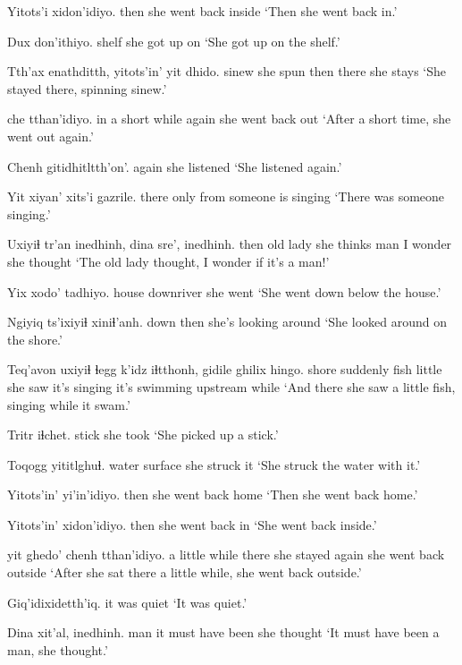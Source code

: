 \documentclass[12pt]{article}
\begin{document}
\gll Yitots'i xidon'idiyo.
then {she went back inside}
\glt `Then she went back in.'
\glend

\gll Dux don'ithiyo.
shelf {she got up on}
\glt `She got up on the shelf.'
\glend

\gll Tth'ax enathditth, yitots'in' yit dhido.
sinew {she spun} then there {she stays}
\glt `She stayed there, spinning sinew.'
\glend

 che tthan'idiyo.
{in a short while} again {she went back out}
\glt `After a short time, she went out again.'
\glend

\gll Chenh gitidhitltth'on'.
again {she listened}
\glt `She listened again.'
\glend

\gll Yit xiyan' xits'i gazrile.
there only from {someone is singing}
\glt `There was someone singing.'
\glend

\gll Uxiyiɬ tr'an inedhinh, dina sre', inedhinh.
then {old lady} {she thinks} man {I wonder} {she thought}
\glt `The old lady thought, I wonder if it's a man!'
\glend

\gll Yix xodo' tadhiyo.
house downriver {she went}
\glt `She went down below the house.'
\glend

\gll Ngiyiq ts'ixiyiɬ xiniɬ'anh.
down then {she's looking around}
\glt `She looked around on the shore.'
\glend

\gll Teq'avon uxiyiɬ ɬegg k'idz iɬtthonh, gidile ghilix hingo.
shore suddenly fish little {she saw} {it's singing} {it's swimming upstream} while
\glt `And there she saw a little fish, singing while it swam.'
\glend

\gll Tritr iɬchet.
stick {she took}
\glt `She picked up a stick.'
\glend

\gll Toqogg yititlghuɬ.
{water surface} {she struck it}
\glt `She struck the water with it.'
\glend

\gll Yitots'in' yi'in'idiyo.
then {she went back home}
\glt `Then she went back home.'
\glend

\gll Yitots'in' xidon'idiyo.
then {she went back in}
\glt `She went back inside.'
\glend

 yit ghedo' chenh tthan'idiyo.
{a little while} there {she stayed} again {she went back outside}
\glt `After she sat there a little while, she went back outside.'
\glend

\gll Giq'idixidetth'iq.
{{it was quiet}}
\glt `It was quiet.'
\glend

\gll Dina xit'al, inedhinh.
man {it must have been} {she thought}
\glt `It must have been a man, she thought.'
\glend
\end{document}
